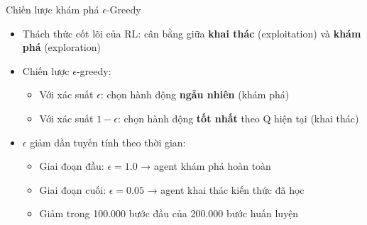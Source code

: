 \begin{frame}{Chiến lược khám phá $\epsilon$-Greedy}
\begin{itemize}
    \item Thách thức cốt lõi của RL: cân bằng giữa \textbf{khai thác} (exploitation) và \textbf{khám phá} (exploration)
    \item Chiến lược $\epsilon$-greedy:
    \begin{itemize}
        \item Với xác suất $\epsilon$: chọn hành động \textbf{ngẫu nhiên} (khám phá)
        \item Với xác suất $1 - \epsilon$: chọn hành động \textbf{tốt nhất} theo Q hiện tại (khai thác)
    \end{itemize}
    \item $\epsilon$ giảm dần tuyến tính theo thời gian:
    \begin{itemize}
        \item Giai đoạn đầu: $\epsilon = 1.0$ → agent khám phá hoàn toàn
        \item Giai đoạn cuối: $\epsilon = 0.05$ → agent khai thác kiến thức đã học
        \item Giảm trong 100.000 bước đầu của 200.000 bước huấn luyện
    \end{itemize}
\end{itemize}
\end{frame}
